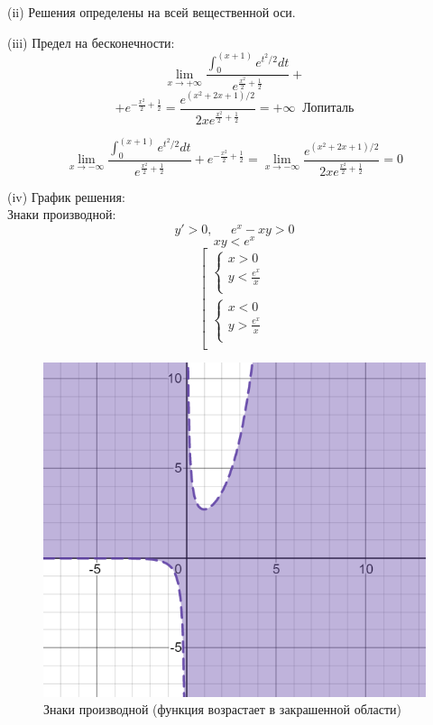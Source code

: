 \documentclass[a4paper, 12pt]{article}
\begin{document}
(ii) Решения определены на всей вещественной оси.

(iii) Предел на бесконечности:
\[ \lim_{x\rightarrow +\infty} \frac  {\int_{0}^{(x+1)} e^{t^2/2} dt} {e^{\frac{x^2} 2 + \frac 1 2 }}+\]
\[+e^{-\frac{x^2} 2 +\frac 1 2 }= \frac  {e^{(x^2+2x+1)/ 2}} {2x e^{\frac{x^2} 2 + \frac 1 2 }} = +\infty \;\;\text{Лопиталь}\]

\[\lim_{x\rightarrow -\infty} \frac  {\int_{0}^{(x+1)} e^{t^2/2} dt} {e^{\frac{x^2} 2 + \frac 1 2 }}+e^{-\frac{x^2} 2 +\frac 1 2 }=\lim_{x\rightarrow -\infty} \frac  {e^{(x^2+2x+1)/ 2}} {2x e^{\frac{x^2} 2 + \frac 1 2 }} = 0\]

(iv) График решения:\\
Знаки производной:
\[y' > 0,\;\;\;\;\; e^x-xy>0\]
\[xy<e^x\]
\[
\left[ 
  \begin{gathered} 
    \left\{ 
      \begin{gathered} 
        x  > 0
        \\ 
        y < \frac {e^x} {x}
        \\
      \end{gathered} 
    \right.  
    \\ 
    \left\{ 
      \begin{gathered} 
        x  < 0
        \\ 
        y > \frac {e^x} {x}
        \\
      \end{gathered} 
    \right.
    \\
  \end{gathered}
\right.
\]
\begin{figure}[H]
	\centering
	\includegraphics[scale=0.5]{11}
	\caption{Знаки производной (функция возрастает в закрашенной области)}
\end{figure}
\end{document}
